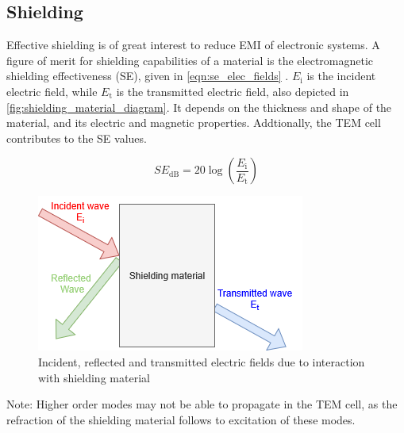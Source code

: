 \subsection{Shielding}

Effective shielding is of great interest to reduce EMI of electronic systems. A figure of merit for shielding capabilities of a material is the electromagnetic shielding effectiveness (SE), given in \autoref{eqn:se_elec_fields} \cite{10518640}. $E_\mathrm{i}$ is the incident electric field, while $E_\mathrm{t}$ is the transmitted electric field, also depicted in \autoref{fig:shielding_material_diagram}. It depends on the thickness and shape of the material, and its electric and magnetic properties. Addtionally, the TEM cell contributes to the SE values.

\begin{equation}
    SE_{\mathrm{dB}}=20\log{(\frac{E_\mathrm{i}}{E_\mathrm{t}})}
    \label{eqn:se_elec_fields}
\end{equation}

\begin{figure}[h]
    \centering
    \includegraphics[width=0.35\linewidth]{Documentation//images/shielding_material_diagram.png}
    \caption{Incident, reflected and transmitted electric fields due to interaction with shielding material}
    \label{fig:shielding_material_diagram}
\end{figure}

Note: Higher order modes may not be able to propagate in the TEM cell, as the refraction of the shielding material follows to excitation of these modes.

